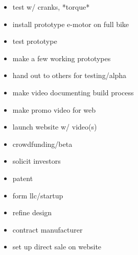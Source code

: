 \documentclass[11pt]{article} %
\begin{document}
\vspace{5mm}

\begin{itemize}
\item test w/ cranks, *torque*
\end{itemize}

\vspace{5mm}

\begin{itemize}
\item install prototype e-motor on full bike
\item test prototype
\end{itemize}

\vspace{5mm}

\begin{itemize}
\item make a few working prototypes
\item hand out to others for testing/alpha
\end{itemize}

\vspace{5mm}

\begin{itemize}
\item make video documenting build process
\item make promo video for web
\end{itemize}

\vspace{5mm}

\begin{itemize}
\item launch website w/ video(s)
\item crowdfunding/beta
\end{itemize}

\vspace{5mm}

\begin{itemize}
\item solicit investors
\item patent
\item form llc/startup
\end{itemize}

\vspace{5mm}

\begin{itemize}
\item refine design
\item contract manufacturer
\item set up direct sale on website
\end{itemize}
\end{document}
